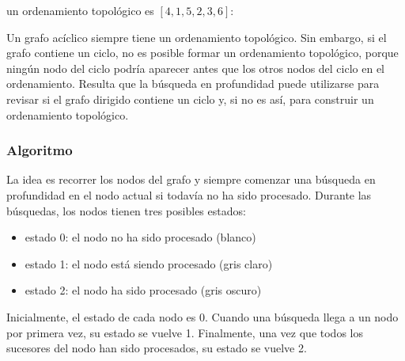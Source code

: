 un ordenamiento topológico es $[4,1,5,2,3,6]$:
\begin{center}
\end{center}

Un grafo acíclico siempre tiene un ordenamiento topológico.
Sin embargo, si el grafo contiene un ciclo, no es posible formar
un ordenamiento topológico, porque ningún nodo del ciclo podría
aparecer antes que los otros nodos del ciclo en el ordenamiento.
Resulta que la búsqueda en profundidad puede utilizarse para
revisar si el grafo dirigido contiene un ciclo y, si no es así,
para construir un ordenamiento topológico.

\subsubsection{Algoritmo}

La idea es recorrer los nodos del grafo y siempre comenzar
una búsqueda en profundidad en el nodo actual si todavía no ha sido
procesado. Durante las búsquedas, los nodos tienen tres posibles estados:

\begin{itemize}
    \item estado 0: el nodo no ha sido procesado (blanco)
    \item estado 1: el nodo está siendo procesado (gris claro)
    \item estado 2: el nodo ha sido procesado (gris oscuro)
\end{itemize}

Inicialmente, el estado de cada nodo es 0. Cuando una búsqueda
llega a un nodo por primera vez, su estado se vuelve 1. Finalmente,
una vez que todos los sucesores del nodo han sido procesados,
su estado se vuelve 2.

